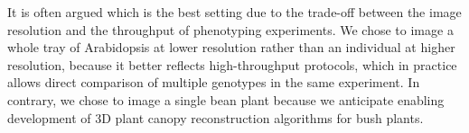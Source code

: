 
It is often argued which is the best setting due to the trade-off between the image resolution and the throughput of phenotyping experiments.
We chose to image a whole tray of Arabidopsis at lower resolution rather than an individual at higher resolution, because it better reflects high-throughput protocols, which in practice allows direct comparison of multiple genotypes in the same experiment.
In contrary, we chose to image a single bean plant because we anticipate enabling development of $3$D plant canopy reconstruction algorithms for bush plants.

